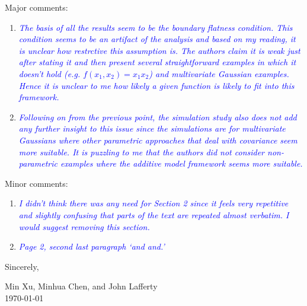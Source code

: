 \documentclass[pdftex,12pt]{article}
\def\reviewercomment#1{{\it\textcolor{blue}{#1}}\smallskip}
\begin{document}
Major comments:

\begin{enumerate}
\item \reviewercomment{The basis of all the results seem to be the boundary flatness
condition. This condition seems to be an artifact of the analysis and
based on my reading, it is unclear how restrctive this assumption
is. The authors claim it is weak just after stating it and then
present several straightforward examples in which it doesn't hold
(e.g. $f(x_1,x_2)=x_1 x_2$) and multivariate Gaussian examples. Hence it is unclear to me how
likely a given function is likely to fit into this framework.}

\item \reviewercomment{Following on from the previous point, the simulation study also does
not add any further insight to this issue since the simulations are
for multivariate Gaussians where other parametric approaches that deal
with covariance seem more suitable. It is puzzling to me that the
authors did not consider non-parametric examples where the additive
model framework seems more suitable.}

\end{enumerate}

Minor comments:

\begin{enumerate}
\item \reviewercomment{I didn't think there was any need for Section 2
  since it feels very repetitive and slightly confusing that parts of
  the text are repeated almost verbatim. I would suggest removing this section.}

\item \reviewercomment{Page 2, second last paragraph `and and.'}
\end{enumerate}


\vspace*{10pt}

Sincerely, 


Min Xu, Minhua Chen, and John Lafferty\\[1pt]
\today{}


\end{document}
